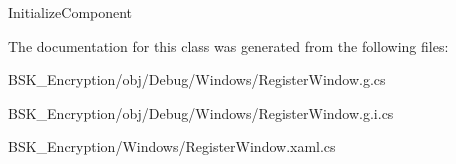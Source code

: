 Initialize\+Component 



The documentation for this class was generated from the following files\+:\begin{DoxyCompactItemize}
\item 
B\+S\+K\+\_\+\+Encryption/obj/\+Debug/\+Windows/Register\+Window.\+g.\+cs\item 
B\+S\+K\+\_\+\+Encryption/obj/\+Debug/\+Windows/Register\+Window.\+g.\+i.\+cs\item 
B\+S\+K\+\_\+\+Encryption/\+Windows/Register\+Window.\+xaml.\+cs\end{DoxyCompactItemize}
